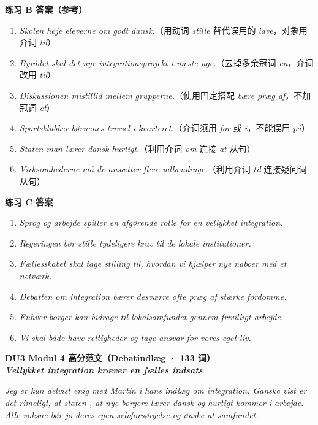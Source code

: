 \begin{answerbox}
\textbf{练习 B 答案（参考）}
\begin{enumerate}
  \item \textit{Skolen  høje  eleverne om godt dansk.}（用动词 \textit{stille} 替代误用的 \textit{lave}，对象用介词 \textit{til}）
  \item \textit{Byrådet skal  det nye integrationsprojekt i næste uge.}（去掉多余冠词 \textit{en}，介词改用 \textit{til}）
  \item \textit{Diskussionen  mistillid mellem grupperne.}（使用固定搭配 \textit{bære præg af}，不加冠词 \textit{et}）
  \item \textit{Sportsklubber  børnenes trivsel i kvarteret.}（介词须用 \textit{for} 或 \textit{i}，不能误用 \textit{på}）
  \item \textit{Staten  man lærer dansk hurtigt.}（利用介词 \textit{om} 连接 \textit{at} 从句）
  \item \textit{Virksomhederne må  de ansætter flere udlændinge.}（利用介词 \textit{til} 连接疑问词从句）
\end{enumerate}

\textbf{练习 C 答案}
\begin{enumerate}
  \item \textit{Sprog og arbejde spiller en afgørende rolle for en vellykket integration.}
  \item \textit{Regeringen bør stille tydeligere krav til de lokale institutioner.}
  \item \textit{Fællesskabet skal tage stilling til, hvordan vi hjælper nye naboer med et netværk.}
  \item \textit{Debatten om integration bærer desværre ofte præg af stærke fordomme.}
  \item \textit{Enhver borger kan bidrage til lokalsamfundet gennem frivilligt arbejde.}
  \item \textit{Vi skal både have rettigheder og tage ansvar for vores eget liv.}
\end{enumerate}

\textbf{DU3 Modul 4 高分范文（Debatindlæg · 133 词）}\\
\textit{\textbf{Vellykket integration kræver en fælles indsats}}

\textit{Jeg er kun delvist enig med Martin i hans indlæg om integration. Ganske vist er det rimeligt, at staten , at nye borgere lærer dansk og hurtigt kommer i arbejde. Alle voksne bør jo  deres egen selvforsørgelse og ønske at  samfundet.}


\end{answerbox}
